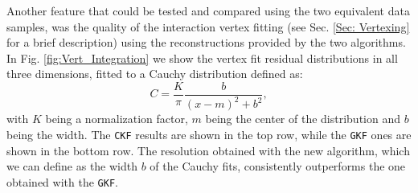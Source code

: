 Another feature that could be tested and compared using the two equivalent data samples, was the quality of the interaction vertex fitting (see Sec. \ref{Sec: Vertexing} for a brief description) using the reconstructions provided by the two algorithms. In Fig. \ref{fig:Vert_Integration} we show the vertex fit residual distributions in all three dimensions, fitted to a Cauchy distribution defined as:
\begin{equation}
    \label{eq:Cauchy}
    C=\frac{K}{\pi}\frac{b}{(x-m)^2+b^2},
\end{equation}
with $K$ being a normalization factor, $m$ being the center of the distribution and $b$ being the width. The \texttt{CKF} results are shown in the top row, while the \texttt{GKF} ones are shown in the bottom row. The resolution obtained with the new algorithm, which we can define as the width $b$ of the Cauchy fits, consistently outperforms the one obtained with the \texttt{GKF}. 



